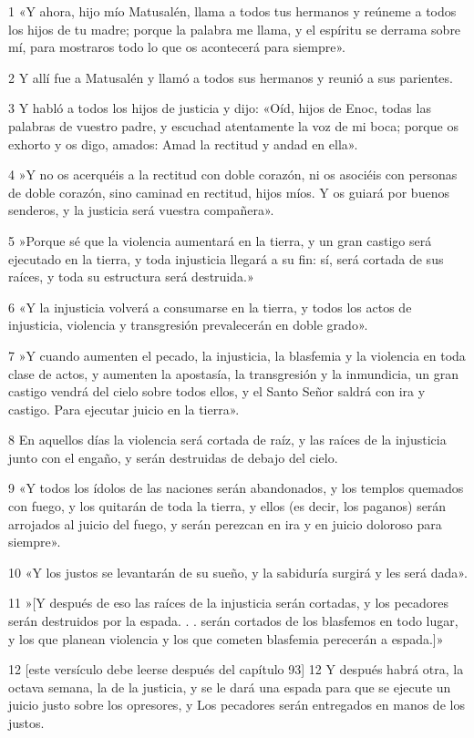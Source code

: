 \par 1 «Y ahora, hijo mío Matusalén, llama a todos tus hermanos y reúneme a todos los hijos de tu madre; porque la palabra me llama, y ​​el espíritu se derrama sobre mí, para mostraros todo lo que os acontecerá para siempre».
\par 2 Y allí fue a Matusalén y llamó a todos sus hermanos y reunió a sus parientes.
\par 3 Y habló a todos los hijos de justicia y dijo: «Oíd, hijos de Enoc, todas las palabras de vuestro padre, y escuchad atentamente la voz de mi boca; porque os exhorto y os digo, amados: Amad la rectitud y andad en ella».
\par 4 »Y no os acerquéis a la rectitud con doble corazón, ni os asociéis con personas de doble corazón, sino caminad en rectitud, hijos míos. Y os guiará por buenos senderos, y la justicia será vuestra compañera».
\par 5 »Porque sé que la violencia aumentará en la tierra, y un gran castigo será ejecutado en la tierra, y toda injusticia llegará a su fin: sí, será cortada de sus raíces, y toda su estructura será destruida.»
\par 6 «Y la injusticia volverá a consumarse en la tierra, y todos los actos de injusticia, violencia y transgresión prevalecerán en doble grado».
\par 7 »Y cuando aumenten el pecado, la injusticia, la blasfemia y la violencia en toda clase de actos, y aumenten la apostasía, la transgresión y la inmundicia, un gran castigo vendrá del cielo sobre todos ellos, y el Santo Señor saldrá con ira y castigo. Para ejecutar juicio en la tierra».
\par 8 En aquellos días la violencia será cortada de raíz, y las raíces de la injusticia junto con el engaño, y serán destruidas de debajo del cielo.
\par 9 «Y todos los ídolos de las naciones serán abandonados, y los templos quemados con fuego, y los quitarán de toda la tierra, y ellos (es decir, los paganos) serán arrojados al juicio del fuego, y serán perezcan en ira y en juicio doloroso para siempre».
\par 10 «Y los justos se levantarán de su sueño, y la sabiduría surgirá y les será dada».
\par 11 »[Y después de eso las raíces de la injusticia serán cortadas, y los pecadores serán destruidos por la espada. . . serán cortados de los blasfemos en todo lugar, y los que planean violencia y los que cometen blasfemia perecerán a espada.]»
\par 12 [este versículo debe leerse después del capítulo 93] 12 Y después habrá otra, la octava semana, la de la justicia, y se le dará una espada para que se ejecute un juicio justo sobre los opresores, y Los pecadores serán entregados en manos de los justos.
